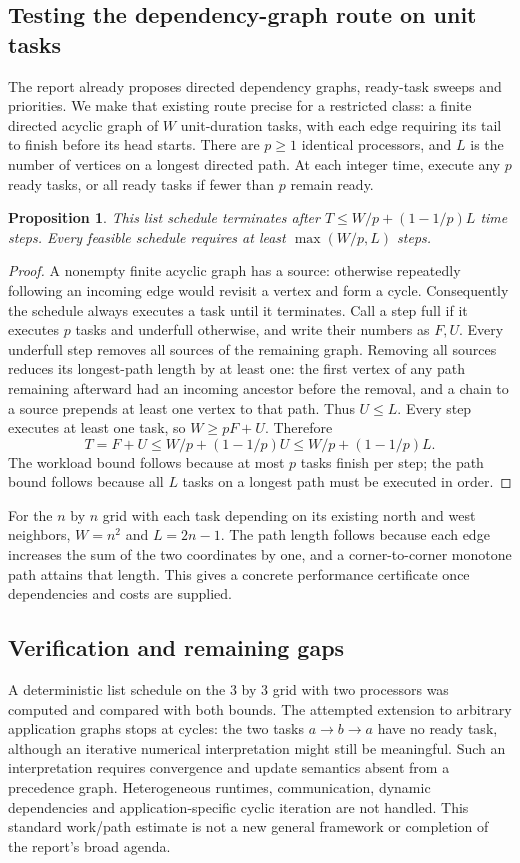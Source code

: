 \documentclass[11pt]{article}
\newtheorem{proposition}{Proposition}
\begin{document}
\subsection{Testing the dependency-graph route on unit tasks}
The report already proposes directed dependency graphs, ready-task sweeps and priorities. We make that existing route precise for a restricted class: a finite directed acyclic graph of $W$ unit-duration tasks, with each edge requiring its tail to finish before its head starts. There are $p\ge1$ identical processors, and $L$ is the number of vertices on a longest directed path. At each integer time, execute any $p$ ready tasks, or all ready tasks if fewer than $p$ remain ready.
\begin{proposition}
This list schedule terminates after $T\le W/p+(1-1/p)L$ time steps. Every feasible schedule requires at least $\max(W/p,L)$ steps.
\end{proposition}
\begin{proof}
A nonempty finite acyclic graph has a source: otherwise repeatedly following an incoming edge would revisit a vertex and form a cycle. Consequently the schedule always executes a task until it terminates. Call a step full if it executes $p$ tasks and underfull otherwise, and write their numbers as $F,U$. Every underfull step removes all sources of the remaining graph. Removing all sources reduces its longest-path length by at least one: the first vertex of any path remaining afterward had an incoming ancestor before the removal, and a chain to a source prepends at least one vertex to that path. Thus $U\le L$. Every step executes at least one task, so $W\ge pF+U$. Therefore
\[
T=F+U\le W/p+(1-1/p)U\le W/p+(1-1/p)L.
\]
The workload bound follows because at most $p$ tasks finish per step; the path bound follows because all $L$ tasks on a longest path must be executed in order.
\end{proof}
For the $n$ by $n$ grid with each task depending on its existing north and west neighbors, $W=n^2$ and $L=2n-1$. The path length follows because each edge increases the sum of the two coordinates by one, and a corner-to-corner monotone path attains that length. This gives a concrete performance certificate once dependencies and costs are supplied.
\subsection{Verification and remaining gaps}
A deterministic list schedule on the $3$ by $3$ grid with two processors was computed and compared with both bounds. The attempted extension to arbitrary application graphs stops at cycles: the two tasks $a\to b\to a$ have no ready task, although an iterative numerical interpretation might still be meaningful. Such an interpretation requires convergence and update semantics absent from a precedence graph. Heterogeneous runtimes, communication, dynamic dependencies and application-specific cyclic iteration are not handled. This standard work/path estimate is not a new general framework or completion of the report's broad agenda.
\end{document}

